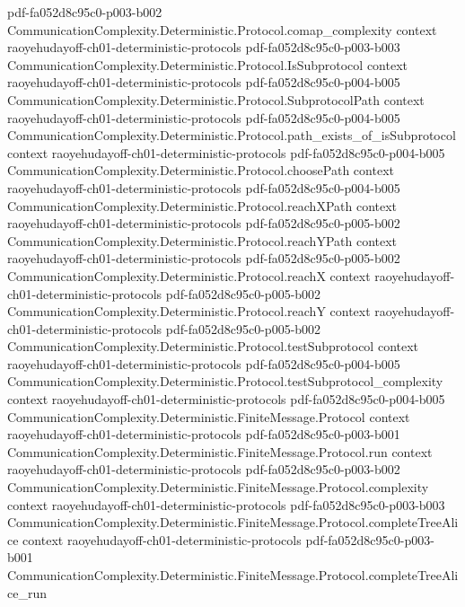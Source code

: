 \begin{theorem}
  {pdf-fa052d8c95c0-p003-b002}
\proofstep
  {CommunicationComplexity.Deterministic.Protocol.comap_complexity}
  {context}
  {raoyehudayoff-ch01-deterministic-protocols}
  {pdf-fa052d8c95c0-p003-b003}
\proofstep
  {CommunicationComplexity.Deterministic.Protocol.IsSubprotocol}
  {context}
  {raoyehudayoff-ch01-deterministic-protocols}
  {pdf-fa052d8c95c0-p004-b005}
\proofstep
  {CommunicationComplexity.Deterministic.Protocol.SubprotocolPath}
  {context}
  {raoyehudayoff-ch01-deterministic-protocols}
  {pdf-fa052d8c95c0-p004-b005}
\proofstep
  {CommunicationComplexity.Deterministic.Protocol.path_exists_of_isSubprotocol}
  {context}
  {raoyehudayoff-ch01-deterministic-protocols}
  {pdf-fa052d8c95c0-p004-b005}
\proofstep
  {CommunicationComplexity.Deterministic.Protocol.choosePath}
  {context}
  {raoyehudayoff-ch01-deterministic-protocols}
  {pdf-fa052d8c95c0-p004-b005}
\proofstep
  {CommunicationComplexity.Deterministic.Protocol.reachXPath}
  {context}
  {raoyehudayoff-ch01-deterministic-protocols}
  {pdf-fa052d8c95c0-p005-b002}
\proofstep
  {CommunicationComplexity.Deterministic.Protocol.reachYPath}
  {context}
  {raoyehudayoff-ch01-deterministic-protocols}
  {pdf-fa052d8c95c0-p005-b002}
\proofstep
  {CommunicationComplexity.Deterministic.Protocol.reachX}
  {context}
  {raoyehudayoff-ch01-deterministic-protocols}
  {pdf-fa052d8c95c0-p005-b002}
\proofstep
  {CommunicationComplexity.Deterministic.Protocol.reachY}
  {context}
  {raoyehudayoff-ch01-deterministic-protocols}
  {pdf-fa052d8c95c0-p005-b002}
\proofstep
  {CommunicationComplexity.Deterministic.Protocol.testSubprotocol}
  {context}
  {raoyehudayoff-ch01-deterministic-protocols}
  {pdf-fa052d8c95c0-p004-b005}
\proofstep
  {CommunicationComplexity.Deterministic.Protocol.testSubprotocol_complexity}
  {context}
  {raoyehudayoff-ch01-deterministic-protocols}
  {pdf-fa052d8c95c0-p004-b005}
\proofstep
  {CommunicationComplexity.Deterministic.FiniteMessage.Protocol}
  {context}
  {raoyehudayoff-ch01-deterministic-protocols}
  {pdf-fa052d8c95c0-p003-b001}
\proofstep
  {CommunicationComplexity.Deterministic.FiniteMessage.Protocol.run}
  {context}
  {raoyehudayoff-ch01-deterministic-protocols}
  {pdf-fa052d8c95c0-p003-b002}
\proofstep
  {CommunicationComplexity.Deterministic.FiniteMessage.Protocol.complexity}
  {context}
  {raoyehudayoff-ch01-deterministic-protocols}
  {pdf-fa052d8c95c0-p003-b003}
\proofstep
  {CommunicationComplexity.Deterministic.FiniteMessage.Protocol.completeTreeAlice}
  {context}
  {raoyehudayoff-ch01-deterministic-protocols}
  {pdf-fa052d8c95c0-p003-b001}
\proofstep
  {CommunicationComplexity.Deterministic.FiniteMessage.Protocol.completeTreeAlice_run}

\end{theorem}
